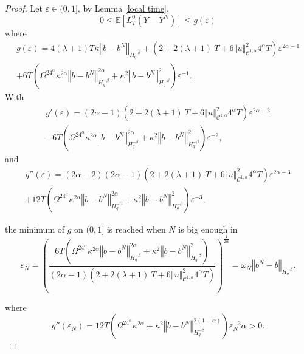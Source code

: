 \documentclass[11pt]{enstaPRE}
\newcommand{\norme}[1]{\left\Vert #1\right\Vert}
\newcommand{\E}{\mathbb{E}}
\begin{document}
\begin{proof}
    Let $\varepsilon\in(0,1]$, by Lemma \ref{local time},    
    \begin{equation*}
    0\leq\E\left[L^0_T(Y-Y^N)\right]\leq g(\varepsilon)
    \end{equation*}
    where \begin{multline*}
    g(\varepsilon) = 4(\lambda + 1)T\kappa\norme{b-b^N}_{H^{-\beta}_{q}} + \left(2 + 2(\lambda + 1)\ T + 6\norme{u}_{\mathcal{C}^{1,\alpha}}^2 4^{\alpha}T\right) \varepsilon^{2\alpha-1} \\ + 6T\left(\Omega^24^{\alpha}\kappa^{2\alpha} \norme{b-b^N}_{H^{-\beta}_q}^{2\alpha}+\kappa^2\norme{b-b^N}_{H^{-\beta}_{q}}^2\right)\varepsilon^{-1}.
    \end{multline*}    
    With \begin{multline*}
    g'(\varepsilon)=(2\alpha-1)\left(2 + 2(\lambda + 1)\ T + 6\norme{u}_{\mathcal{C}^{1,\alpha}}^2 4^{\alpha}T\right)\varepsilon^{2\alpha-2}\\-6T\left(\Omega^24^{\alpha}\kappa^{2\alpha} \norme{b-b^N}_{H^{-\beta}_q}^{2\alpha}+\kappa^2\norme{b-b^N}_{H^{-\beta}_{q}}^2\right)\varepsilon^{-2},
    \end{multline*}
    and 
    \begin{multline*}
    g''(\varepsilon)=(2\alpha-2)(2\alpha-1)\left(2 + 2(\lambda + 1)\ T + 6\norme{u}_{\mathcal{C}^{1,\alpha}}^2 4^{\alpha}T\right)\varepsilon^{2\alpha-3}\\+12T\left(\Omega^24^{\alpha}\kappa^{2\alpha} \norme{b-b^N}_{H^{-\beta}_q}^{2\alpha}+\kappa^2\norme{b-b^N}_{H^{-\beta}_{q}}^2\right)\varepsilon^{-3},\end{multline*}
    
    the minimum of $g$ on $(0,1]$ is reached when $N$ is big enough in \begin{equation*}
    \varepsilon_N=\left(\frac{6T\left(\Omega^24^{\alpha}\kappa^{2\alpha} \norme{b-b^N}_{H^{-\beta}_q}^{2\alpha}+\kappa^2\norme{b-b^N}_{H^{-\beta}_{q}}^2\right)}{(2\alpha-1)\left(2 + 2(\lambda + 1)\ T + 6\norme{u}_{\mathcal{C}^{1,\alpha}}^2 4^{\alpha}T\right)}\right)^{\frac{1}{2\alpha}}=\omega_N \norme{b^N-b}_{H^{-\beta}_{q}}.
    \end{equation*}
    
    where 
    \begin{equation*}
    g''(\varepsilon_N)
    =12T\left(\Omega^24^{\alpha}\kappa^{2\alpha} +\kappa^2\norme{b-b^N}_{H^{-\beta}_{q}}^{2(1-\alpha)}\right)\varepsilon_N^{-3}\alpha>0.
    \end{equation*}
    

\end{proof}
\end{document}
